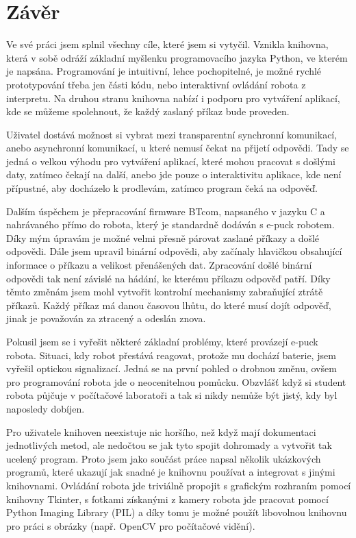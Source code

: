 \chapter{Závěr}

    Ve své práci jsem splnil všechny cíle, které jsem si vytyčil. Vznikla
    knihovna, která v sobě odráží základní myšlenku programovacího jazyka
    Python, ve kterém je napsána. Programování je intuitivní, lehce
    pochopitelné, je možné rychlé prototypování třeba jen části kódu, nebo
    interaktivní ovládání robota z interpretu. Na druhou stranu knihovna nabízí
    i podporu pro vytváření aplikací, kde se můžeme spolehnout, že každý
    zaslaný příkaz bude proveden.

    Uživatel dostává možnost si vybrat mezi transparentní synchronní
    komunikací, anebo asynchronní komunikací, u které nemusí čekat na přijetí
    odpovědi. Tady se jedná o velkou výhodu pro vytváření aplikací, které mohou
    pracovat s došlými daty, zatímco čekají na další, anebo jde pouze o
    interaktivitu aplikace, kde není přípustné, aby docházelo k prodlevám,
    zatímco program čeká na odpověď.

    Dalším úspěchem je přepracování firmware BTcom, napsaného v jazyku C a
    nahrávaného přímo do robota, který je standardně dodáván s e-puck robotem.
    Díky mým úpravám je možné velmi přesně párovat zaslané příkazy a došlé
    odpovědi. Dále jsem upravil binární odpovědi, aby začínaly hlavičkou
    obsahující informace o příkazu a velikost přenášených dat. Zpracování došlé
    binární odpovědi tak není závislé na hádání, ke kterému příkazu odpověď
    patří. Díky těmto změnám jsem mohl vytvořit kontrolní mechanismy
    zabraňující ztrátě příkazů. Každý příkaz má danou časovou lhůtu, do které
    musí dojít odpověď, jinak je považován za ztracený a odeslán znova.

    Pokusil jsem se i vyřešit některé základní problémy, které provázejí e-puck
    robota. Situaci, kdy robot přestává reagovat, protože mu dochází baterie,
    jsem vyřešil optickou signalizací. Jedná se na první pohled o drobnou
    změnu, ovšem pro programování robota jde o neocenitelnou pomůcku. Obzvlášť
    když si student robota půjčuje v počítačové laboratoři a tak si nikdy
    nemůže být jistý, kdy byl naposledy dobíjen.

    Pro uživatele knihoven neexistuje nic horšího, než když mají dokumentaci
    jednotlivých metod, ale nedočtou se jak tyto spojit dohromady a vytvořit
    tak ucelený program. Proto jsem jako součást práce napsal několik
    ukázkových programů, které ukazují jak snadné je knihovnu používat a
    integrovat s jinými knihovnami. Ovládání robota jde triviálně propojit s
    grafickým rozhraním pomocí knihovny Tkinter, s fotkami získanými z kamery
    robota jde pracovat pomocí Python Imaging Library (PIL) a díky tomu je
    možné použít libovolnou knihovnu pro práci s obrázky (např. OpenCV pro
    počítačové vidění).

